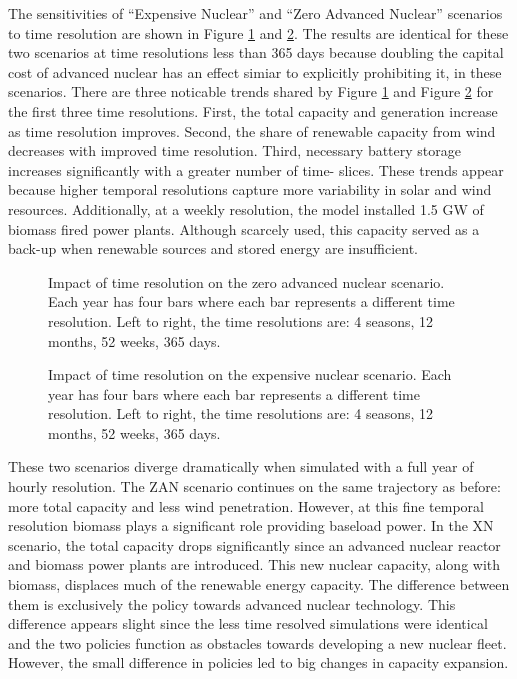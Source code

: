 The sensitivities of ``Expensive Nuclear'' and ``Zero Advanced Nuclear'' scenarios
to time resolution are shown in Figure \ref{fig:time_res_ZAN} and \ref{fig:time_res_XN}.
The results are identical for these two scenarios at time resolutions less than
365 days because doubling the capital cost of advanced nuclear has an effect simiar
to explicitly prohibiting it, in these scenarios.
There are three noticable trends shared by Figure \ref{fig:time_res_ZAN} and Figure
\ref{fig:time_res_XN} for the first three time resolutions.
 First, the total capacity and generation increase as time resolution improves.
Second, the share of renewable capacity from wind decreases with improved time resolution.
Third, necessary battery storage increases significantly with a greater number of time-
slices. These trends appear because higher temporal resolutions capture more
variability in solar and wind resources. Additionally, at a weekly resolution, the
model installed 1.5 GW of biomass fired power plants. Although scarcely used,
this capacity served as a back-up when renewable sources and stored energy are
insufficient.

\begin{figure}[H]
  \centering
  \resizebox{0.95\columnwidth}{!}{}
  \caption{Impact of time resolution on the zero advanced nuclear scenario.
  Each year has four bars where each bar represents a different time resolution.
  Left to right, the time resolutions are: 4 seasons, 12 months, 52 weeks, 365 days.}
  \label{fig:time_res_ZAN}
\end{figure}
\begin{figure}[H]
  \centering
  \resizebox{0.95\columnwidth}{!}{}
  \caption{Impact of time resolution on the expensive nuclear scenario.
  Each year has four bars where each bar represents a different time resolution.
  Left to right, the time resolutions are: 4 seasons, 12 months, 52 weeks, 365 days.}
  \label{fig:time_res_XN}
\end{figure}

These two scenarios diverge dramatically when simulated with a full year of hourly
resolution. The ZAN scenario continues on the same trajectory as before: more total capacity
and less wind penetration. However, at this fine temporal resolution biomass plays
a significant role providing baseload power. In the XN scenario, the total capacity
drops significantly since an advanced nuclear reactor and biomass power plants are
introduced. This new nuclear capacity, along with biomass, displaces much of the
renewable energy capacity. The difference between them is exclusively the policy
towards advanced nuclear technology. This difference appears slight since the less
time resolved simulations were identical and the two policies function as obstacles
towards developing a new nuclear fleet. However, the small difference in policies
led to big changes in capacity expansion.

